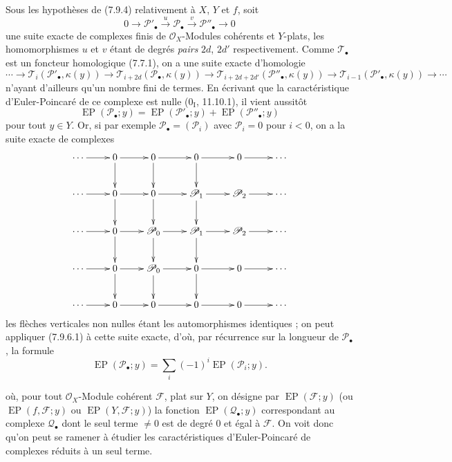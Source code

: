 \begin{env}[7.9.6]
\label{III.7.9.6.fr}
Sous les hypothèses de (7.9.4) relativement à $X$, $Y$ et $f$, soit
\[
  0\longrightarrow\mathscr P'_\bullet
  \xrightarrow{u}\mathscr P_\bullet
  \xrightarrow{v}\mathscr P''_\bullet
  \longrightarrow0
\]
une suite exacte de complexes finis de $\mathscr O_X$-Modules cohérents et
$Y$-plats, les homomorphismes $u$ et $v$ étant de degrés \emph{pairs} $2d$,
$2d'$ respectivement. Comme $\mathscr T_\bullet$ est un foncteur homologique
(7.7.1), on a une suite exacte d'homologie
\[
  \cdots\longrightarrow
  \mathscr T_i(\mathscr P'_\bullet,\kappa(y))
  \longrightarrow
  \mathscr T_{i+2d}(\mathscr P_\bullet,\kappa(y))
  \longrightarrow
  \mathscr T_{i+2d+2d'}(\mathscr P''_\bullet,\kappa(y))
  \longrightarrow
  \mathscr T_{i-1}(\mathscr P'_\bullet,\kappa(y))
  \longrightarrow\cdots
\]
n'ayant d'ailleurs qu'un nombre fini de termes. En écrivant que la
caractéristique d'Euler-Poincaré de ce complexe est nulle ($0_{\mathrm I}$,
11.10.1), il vient aussitôt
\[
  \operatorname{EP}(\mathscr P_\bullet;y)
  =\operatorname{EP}(\mathscr P'_\bullet;y)
  +\operatorname{EP}(\mathscr P''_\bullet;y)
  \tag{7.9.6.1}\label{III.7.9.6.1.fr}
\]
pour tout $y\in Y$. Or, si par exemple $\mathscr P_\bullet=(\mathscr P_i)$ avec
$\mathscr P_i=0$ pour $i<0$, on a la suite exacte de complexes
\[
\xymatrix@C=2.4em{
  \cdots \ar[r] & 0 \ar[r]\ar[d] & 0 \ar[r]\ar[d]
    & 0 \ar[r]\ar[d] & 0 \ar[r] & \cdots \\
  \cdots \ar[r] & 0 \ar[r]\ar[d] & 0 \ar[r]\ar[d]
    & \mathscr P_1 \ar[r]\ar[d] & \mathscr P_2 \ar[r] & \cdots \\
  \cdots \ar[r] & 0 \ar[r]\ar[d] & \mathscr P_0 \ar[r]\ar[d]
    & \mathscr P_1 \ar[r]\ar[d] & \mathscr P_2 \ar[r] & \cdots \\
  \cdots \ar[r] & 0 \ar[r]\ar[d] & \mathscr P_0 \ar[r]\ar[d]
    & 0 \ar[r]\ar[d] & 0 \ar[r] & \cdots \\
  \cdots \ar[r] & 0 \ar[r] & 0 \ar[r]
    & 0 \ar[r] & 0 \ar[r] & \cdots
}
\]
les flèches verticales non nulles étant les automorphismes identiques ; on peut
appliquer (7.9.6.1) à cette suite exacte, d'où, par récurrence sur la longueur de
$\mathscr P_\bullet$, la formule
\[
  \operatorname{EP}(\mathscr P_\bullet;y)
  =\sum_i(-1)^i\operatorname{EP}(\mathscr P_i;y).
  \tag{7.9.6.2}\label{III.7.9.6.2.fr}
\]

où, pour tout $\mathscr O_X$-Module cohérent $\mathscr F$, plat sur $Y$, on
désigne par $\operatorname{EP}(\mathscr F;y)$ (ou
$\operatorname{EP}(f,\mathscr F;y)$ ou $\operatorname{EP}(Y,\mathscr F;y)$) la
fonction $\operatorname{EP}(\mathscr Q_\bullet;y)$ correspondant au complexe
$\mathscr Q_\bullet$ dont le seul terme $\ne0$ est de degré $0$ et égal à
$\mathscr F$. On voit donc qu'on peut se ramener à étudier les caractéristiques
d'Euler-Poincaré de complexes réduits à un seul terme.
\end{env}

